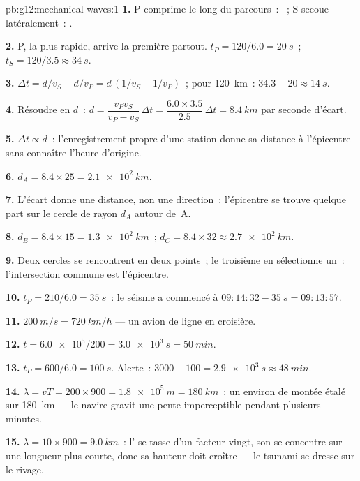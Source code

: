 \begin{solution}{pb:g12:mechanical-waves:1}
\textbf{1.} P comprime le long du parcours~: ~; S secoue
latéralement~: .

\textbf{2.} P, la plus rapide, arrive la première partout.
$t_P = 120/6.0 = \qty{20}{s}$~; $t_S = 120/3.5 \approx \qty{34}{s}$.

\textbf{3.} $\Delta t = d/v_S - d/v_P = d\,(1/v_S - 1/v_P)$~; pour
\qty{120}{km}~: $34.3 - 20 \approx \qty{14}{s}$.

\textbf{4.} Résoudre en $d$~: $d = \dfrac{v_P v_S}{v_P - v_S}\,\Delta t
= \dfrac{6.0 \times 3.5}{2.5}\,\Delta t = \qty{8.4}{km}$ par seconde
d'écart.

\textbf{5.} $\Delta t \propto d$~: l'enregistrement propre d'une station
donne sa distance à l'épicentre sans connaître l'heure d'origine.

\textbf{6.} $d_A = 8.4 \times 25 = \qty{2.1e2}{km}$.

\textbf{7.} L'écart donne une distance, non une direction~: l'épicentre
se trouve quelque part sur le cercle de rayon $d_A$ autour de~A.

\textbf{8.} $d_B = 8.4 \times 15 = \qty{1.3e2}{km}$~;
$d_C = 8.4 \times 32 \approx \qty{2.7e2}{km}$.

\textbf{9.} Deux cercles se rencontrent en deux points~; le troisième en
sélectionne un~: l'intersection commune est l'épicentre.

\textbf{10.} $t_P = 210/6.0 = \qty{35}{s}$~: le séisme a commencé à
$09{:}14{:}32 - \qty{35}{s} = 09{:}13{:}57$.

\textbf{11.} $\qty{200}{m/s} = \qty{720}{km/h}$ --- un avion de ligne
en croisière.

\textbf{12.} $t = \num{6.0e5}/200 = \qty{3.0e3}{s} = \qty{50}{min}$.

\textbf{13.} $t_P = 600/6.0 = \qty{100}{s}$. Alerte~:
$3000 - 100 = \qty{2.9e3}{s} \approx \qty{48}{min}$.

\textbf{14.} $\lambda = vT = 200 \times 900 = \qty{1.8e5}{m} =
\qty{180}{km}$~: un  environ de montée étalé sur \qty{180}{km}
--- le navire gravit une pente imperceptible pendant plusieurs minutes.

\textbf{15.} $\lambda = 10 \times 900 = \qty{9.0}{km}$~: l'
se tasse d'un facteur vingt, son  se concentre sur une
longueur plus courte, donc sa hauteur doit croître --- le tsunami se
dresse sur le rivage.


\end{solution}
